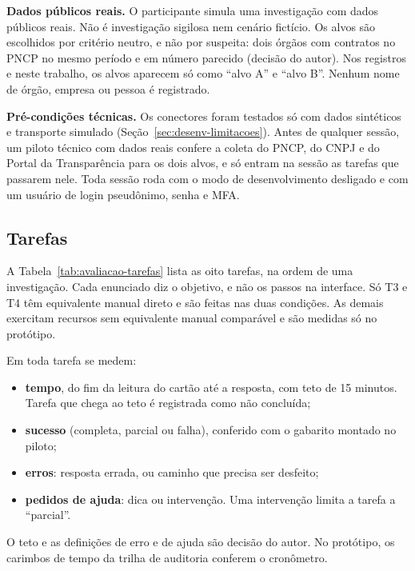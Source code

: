 \textbf{Dados públicos reais.} O participante simula uma investigação com
dados públicos reais. Não é investigação sigilosa nem cenário fictício. Os
alvos são escolhidos por critério neutro, e não por suspeita: dois órgãos
com contratos no PNCP no mesmo período e em número parecido (decisão do
autor). Nos registros e neste trabalho, os alvos aparecem só como ``alvo A''
e ``alvo B''. Nenhum nome de órgão, empresa ou pessoa é registrado.

\textbf{Pré-condições técnicas.} Os conectores foram testados só com dados
sintéticos e transporte simulado (Seção~\ref{sec:desenv-limitacoes}). Antes
de qualquer sessão, um piloto técnico com dados reais confere a coleta do
PNCP, do CNPJ e do Portal da Transparência para os dois alvos, e só entram
na sessão as tarefas que passarem nele. Toda sessão roda com o modo de
desenvolvimento desligado e com um usuário de login pseudônimo, senha e MFA.

\subsection{Tarefas}
\label{sec:avaliacao-tarefas}

A Tabela~\ref{tab:avaliacao-tarefas} lista as oito tarefas, na ordem de uma
investigação. Cada enunciado diz o objetivo, e não os passos na interface.
Só T3 e T4 têm equivalente manual direto e são feitas nas duas condições. As
demais exercitam recursos sem equivalente manual comparável e são medidas
só no protótipo.

Em toda tarefa se medem:
\begin{itemize}
	\item \textbf{tempo}, do fim da leitura do cartão até a resposta, com teto
	de 15 minutos. Tarefa que chega ao teto é registrada como não concluída;
	\item \textbf{sucesso} (completa, parcial ou falha), conferido com o
	gabarito montado no piloto;
	\item \textbf{erros}: resposta errada, ou caminho que precisa ser
	desfeito;
	\item \textbf{pedidos de ajuda}: dica ou intervenção. Uma intervenção
	limita a tarefa a ``parcial''.
\end{itemize}
O teto e as definições de erro e de ajuda são decisão do autor. No
protótipo, os carimbos de tempo da trilha de auditoria conferem o
cronômetro.

